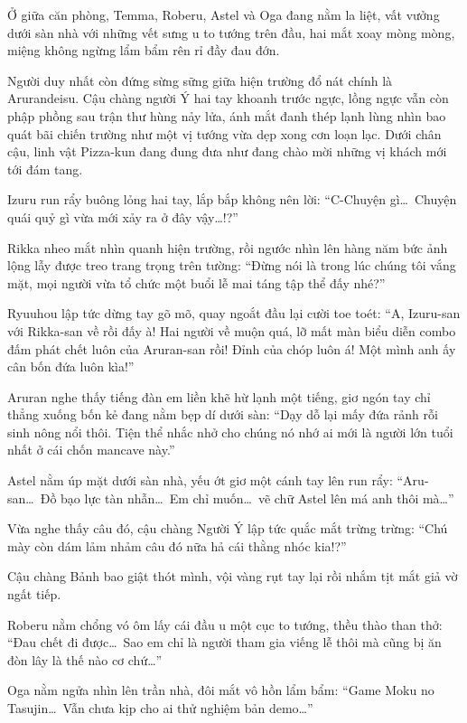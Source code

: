\documentclass[../main.tex]{subfiles}
\begin{document}
Ở giữa căn phòng, Temma, Roberu, Astel và Oga đang nằm la liệt, vất vưởng dưới sàn nhà với những vết sưng u to tướng trên đầu, hai mắt xoay mòng mòng, miệng không ngừng lẩm bẩm rên rỉ đầy đau đớn.

Người duy nhất còn đứng sừng sững giữa hiện trường đổ nát chính là Arurandeisu. Cậu chàng người Ý hai tay khoanh trước ngực, lồng ngực vẫn còn phập phồng sau trận thư hùng nảy lửa, ánh mắt đanh thép lạnh lùng nhìn bao quát bãi chiến trường như một vị tướng vừa dẹp xong cơn loạn lạc. Dưới chân cậu, linh vật Pizza-kun đang đung đưa như đang chào mời những vị khách mới tới đám tang.


Izuru run rẩy buông lỏng hai tay, lắp bắp không nên lời: ``C-Chuyện gì\dots\ Chuyện quái quỷ gì vừa mới xảy ra ở đây vậy\dots!?''

Rikka nheo mắt nhìn quanh hiện trường, rồi ngước nhìn lên hàng năm bức ảnh lộng lẫy được treo trang trọng trên tường: ``Đừng nói là trong lúc chúng tôi vắng mặt, mọi người vừa tổ chức một buổi lễ mai táng tập thể đấy nhé?''

Ryuuhou lập tức dừng tay gõ mõ, quay ngoắt đầu lại cười toe toét: ``A, Izuru-san với Rikka-san về rồi đấy à! Hai người về muộn quá, lỡ mất màn biểu diễn combo đấm phát chết luôn của Aruran-san rồi! Đỉnh của chóp luôn á! Một mình anh ấy cân bốn đứa luôn kìa!''

Aruran nghe thấy tiếng đàn em liền khẽ hừ lạnh một tiếng, giơ ngón tay chỉ thẳng xuống bốn kẻ đang nằm bẹp dí dưới sàn: ``Dạy dỗ lại mấy đứa rảnh rỗi sinh nông nổi thôi. Tiện thể nhắc nhở cho chúng nó nhớ ai mới là người lớn tuổi nhất ở cái chốn mancave này.''

Astel nằm úp mặt dưới sàn nhà, yếu ớt giơ một cánh tay lên run rẩy: ``Aru-san\dots\ Đồ bạo lực tàn nhẫn\dots\ Em chỉ muốn\dots\ vẽ chữ Astel lên má anh thôi mà\dots''

Vừa nghe thấy câu đó, cậu chàng Người Ý lập tức quắc mắt trừng trừng: ``Chú mày còn dám lảm nhảm câu đó nữa hả cái thằng nhóc kia!?''

Cậu chàng Bảnh bao giật thót mình, vội vàng rụt tay lại rồi nhắm tịt mắt giả vờ ngất tiếp.

Roberu nằm chổng vó ôm lấy cái đầu u một cục to tướng, thều thào than thở: ``Đau chết đi được\dots\ Sao em chỉ là người tham gia viếng lễ thôi mà cũng bị ăn đòn lây là thế nào cơ chứ\dots''

Oga nằm ngửa nhìn lên trần nhà, đôi mắt vô hồn lẩm bẩm: ``Game Moku no Tasujin\dots\ Vẫn chưa kịp cho ai thử nghiệm bản demo\dots''
\end{document}
